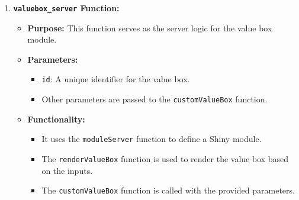 \documentclass[
]{book}
\newenvironment{Shaded}{\begin{snugshade}}{\end{snugshade}}
\newcommand{\AttributeTok}[1]{\textcolor[rgb]{0.13,0.29,0.53}{#1}}
\newcommand{\CommentTok}[1]{\textcolor[rgb]{0.56,0.35,0.01}{\textit{#1}}}
\newcommand{\ControlFlowTok}[1]{\textcolor[rgb]{0.13,0.29,0.53}{\textbf{#1}}}
\newcommand{\DecValTok}[1]{\textcolor[rgb]{0.00,0.00,0.81}{#1}}
\newcommand{\FunctionTok}[1]{\textcolor[rgb]{0.13,0.29,0.53}{\textbf{#1}}}
\newcommand{\NormalTok}[1]{#1}
\newcommand{\OtherTok}[1]{\textcolor[rgb]{0.56,0.35,0.01}{#1}}
\newcommand{\SpecialCharTok}[1]{\textcolor[rgb]{0.81,0.36,0.00}{\textbf{#1}}}
\newcommand{\StringTok}[1]{\textcolor[rgb]{0.31,0.60,0.02}{#1}}
\providecommand{\tightlist}{%
  \setlength{\itemsep}{0pt}\setlength{\parskip}{0pt}}
\begin{document}
\begin{enumerate}
\def\labelenumi{\arabic{enumi}.}
\setcounter{enumi}{1}
\tightlist
\item
  \textbf{\texttt{valuebox\_server} Function:}

  \begin{itemize}
  \tightlist
  \item
    \textbf{Purpose:} This function serves as the server logic for the value box module.
  \item
    \textbf{Parameters:}

    \begin{itemize}
    \tightlist
    \item
      \texttt{id}: A unique identifier for the value box.
    \item
      Other parameters are passed to the \texttt{customValueBox} function.
    \end{itemize}
  \item
    \textbf{Functionality:}

    \begin{itemize}
    \tightlist
    \item
      It uses the \texttt{moduleServer} function to define a Shiny module.
    \item
      The \texttt{renderValueBox} function is used to render the value box based on the inputs.
    \item
      The \texttt{customValueBox} function is called with the provided parameters.
    \end{itemize}
  \end{itemize}
\end{enumerate}

\begin{Shaded}
\end{Shaded}
\end{document}
